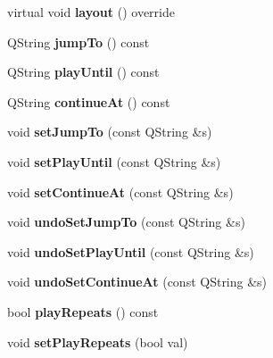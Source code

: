 \begin{DoxyCompactItemize}
virtual void {\bfseries layout} () override
\item 
\mbox{\label{class_ms_1_1_jump_a031593a0c494ce49957af85b1da8a27b}} 
Q\+String {\bfseries jump\+To} () const
\item 
\mbox{\label{class_ms_1_1_jump_a953cc1a53e6a4f455fcbad2fb231e330}} 
Q\+String {\bfseries play\+Until} () const
\item 
\mbox{\label{class_ms_1_1_jump_a556373799e94bd03fae9f22b62a1c04e}} 
Q\+String {\bfseries continue\+At} () const
\item 
\mbox{\label{class_ms_1_1_jump_a039dca7b5b9b960105a644f780b39154}} 
void {\bfseries set\+Jump\+To} (const Q\+String \&s)
\item 
\mbox{\label{class_ms_1_1_jump_a09fb7742920faf63e73d0177bcdce322}} 
void {\bfseries set\+Play\+Until} (const Q\+String \&s)
\item 
\mbox{\label{class_ms_1_1_jump_af3491a54b8bc193b42b963b86f5833f0}} 
void {\bfseries set\+Continue\+At} (const Q\+String \&s)
\item 
\mbox{\label{class_ms_1_1_jump_ac8363fdb58e369be68367cbd77a44f7b}} 
void {\bfseries undo\+Set\+Jump\+To} (const Q\+String \&s)
\item 
\mbox{\label{class_ms_1_1_jump_aad3858947744b9f7ff4114afd12d9a49}} 
void {\bfseries undo\+Set\+Play\+Until} (const Q\+String \&s)
\item 
\mbox{\label{class_ms_1_1_jump_a6a8f193ecb486870d611a824b1a70c0a}} 
void {\bfseries undo\+Set\+Continue\+At} (const Q\+String \&s)
\item 
\mbox{\label{class_ms_1_1_jump_a27dca257b51732eb68b3fffba4a84710}} 
bool {\bfseries play\+Repeats} () const
\item 
\mbox{\label{class_ms_1_1_jump_a3477c60ae6803101e95200ca1506ddf5}} 
void {\bfseries set\+Play\+Repeats} (bool val)
\item 

\end{DoxyCompactItemize}
